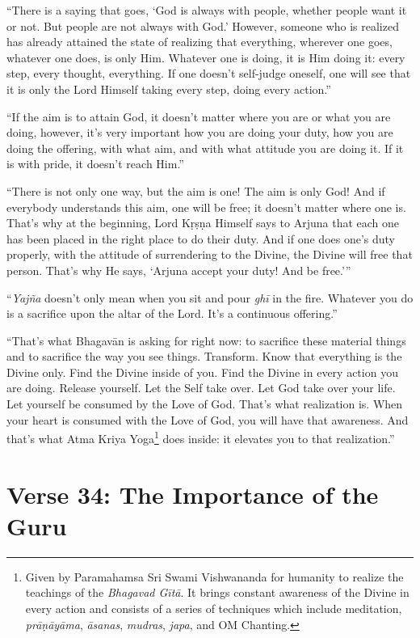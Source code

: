 \enquote{There is a saying that goes, \enquote{God is always with people, whether people want it or not. But people are not always with God.} However, someone who is realized has already attained the state of realizing that everything, wherever one goes, whatever one does, is only Him. Whatever one is doing, it is Him doing it: every step, every thought, everything. If one doesn’t self-judge oneself, one will see that it is only the Lord Himself taking every step, doing every action.}

\enquote{If the aim is to attain God, it doesn’t matter where you are or what you are doing, however, it’s very important how you are doing your duty, how you are doing the offering, with what aim, and with what attitude you are doing it. If it is with pride, it doesn’t reach Him.}

\enquote{There is not only one way, but the aim is one! The aim is only God! And if everybody understands this aim, one will be free; it doesn’t matter where one is. That’s why at the beginning, Lord Kṛṣṇa Himself says to Arjuna that each one has been placed in the right place to do their duty. And if one does one’s duty properly, with the attitude of surrendering to the Divine, the Divine will free that person. That’s why He says, \enquote{Arjuna accept your duty! And be free.}}

\enquote{\textit{Yajña} doesn’t only mean when you sit and pour \textit{ghī} in the fire. Whatever you do is a sacrifice upon the altar of the Lord. It’s a continuous offering.}

\enquote{That’s what Bhagavān is asking for right now: to sacrifice these material things and to sacrifice the way you see things. Transform. Know that everything is the Divine only. Find the Divine inside of you. Find the Divine in every action you are doing. Release yourself. Let the Self take over. Let God take over your life. Let yourself be consumed by the Love of God. That’s what realization is. When your heart is consumed with the Love of God, you will have that awareness. And that’s what Atma Kriya Yoga\footnote{Given by Paramahamsa Sri Swami Vishwananda for humanity to realize the teachings of the \textit{Bhagavad Gītā}. It brings constant awareness of the Divine in every action and consists of a series of techniques which include meditation, \textit{prāṇāyāma}, \textit{āsanas}, \textit{mudras}, \textit{japa}, and OM Chanting.} does inside: it elevates you to that realization.}

\section{Verse 34: The Importance of the Guru}\label{sec-verse-34-the-importance-of-the-guru}

